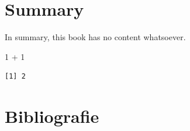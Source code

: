 \documentclass[
  11pt,
  b5paper,
  nottoc]{book}
\newenvironment{Shaded}{\begin{snugshade}}{\end{snugshade}}
\newcommand{\DecValTok}[1]{\textcolor[rgb]{0.68,0.00,0.00}{#1}}
\newcommand{\SpecialCharTok}[1]{\textcolor[rgb]{0.37,0.37,0.37}{#1}}
\newlength{\cslhangindent}
\newlength{\cslentryspacingunit} %
\newenvironment{CSLReferences}[2] %
 {%
  \setlength{\parindent}{0pt}
  \ifodd #1
  \let\oldpar\par
  \def\par{\hangindent=\cslhangindent\oldpar}
  \fi
  \setlength{\parskip}{#2\cslentryspacingunit}
 }%
 {}
\begin{document}

\hypertarget{summary}{%
\chapter*{Summary}\label{summary}}


In summary, this book has no content whatsoever.

\begin{Shaded}
\begin{Highlighting}[]
\DecValTok{1} \SpecialCharTok{+} \DecValTok{1}
\end{Highlighting}
\end{Shaded}

\begin{verbatim}
[1] 2
\end{verbatim}


\hypertarget{bibliografie}{%
\chapter*{Bibliografie}\label{bibliografie}}


\hypertarget{refs}{}
\begin{CSLReferences}{0}{0}
\end{CSLReferences}


\backmatter
\end{document}

